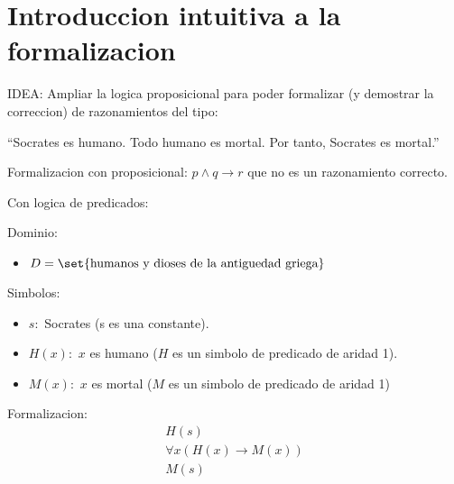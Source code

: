\section{Introduccion intuitiva a la formalizacion}
IDEA: Ampliar la logica proposicional para poder formalizar (y demostrar la correccion) de razonamientos del tipo:

``Socrates es humano. Todo humano es mortal. Por tanto, Socrates es mortal.''

Formalizacion con proposicional: \(p \wedge q \rightarrow r \)
que no es un razonamiento correcto.

Con logica de predicados:

Dominio:
\begin{itemize}
	\item \(D = \set{\text{humanos y dioses de la antiguedad griega} }\)
\end{itemize}
Simbolos:
\begin{itemize}
	\item \(s: \) Socrates (s es una constante).
	\item \(H(x): \) \(x \) es humano (\(H \) es un simbolo de predicado de aridad 1).
	\item \(M(x): \) \(x \) es mortal (\(M \) es un simbolo de predicado de aridad 1)
\end{itemize}
Formalizacion:
\[
	\begin{array}{l}
		H(s)                      \\
		\forall x (H(x) \to M(x)) \\
		\hline
		M(s)
	\end{array}
\]

